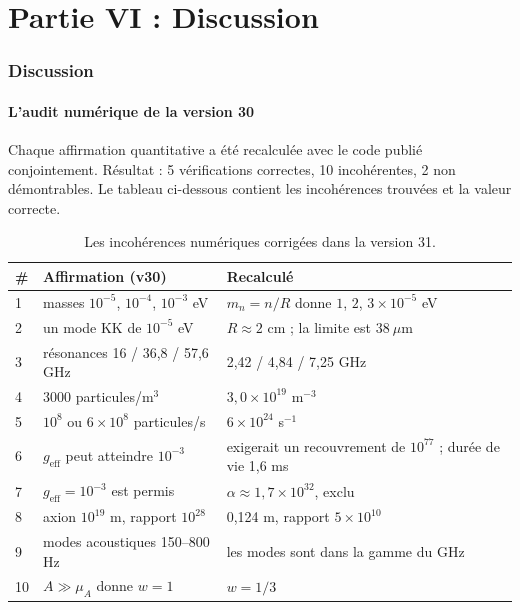 \part*{Partie VI : Discussion}

\section{Discussion}
\subsection{L'audit numérique de la version 30}
Chaque affirmation quantitative a été recalculée avec le code publié conjointement. Résultat : 5 vérifications correctes, 10 incohérentes, 2 non démontrables. Le tableau ci-dessous contient les incohérences trouvées et la valeur correcte.

\begin{table}[H]
\centering
\small
\begin{tabular}{@{}p{0.5cm}p{6.2cm}p{5.2cm}@{}}
\toprule
\# & \textbf{Affirmation (v30)} & \textbf{Recalculé} \\ \midrule
1 & masses $10^{-5}$, $10^{-4}$, $10^{-3}$ eV & $m_n = n/R$ donne $1$, $2$, $3 \times 10^{-5}$ eV \\
2 & un mode KK de $10^{-5}$ eV & $R \approx 2$ cm ; la limite est $38\ \mu$m \\
3 & résonances 16 / 36,8 / 57,6 GHz & 2,42 / 4,84 / 7,25 GHz \\
4 & 3000 particules/m$^3$ & $3,0\times10^{19}$ m$^{-3}$ \\
5 & $10^8$ ou $6\times10^8$ particules/s & $6\times10^{24}$ s$^{-1}$ \\
6 & $g_{\text{eff}}$ peut atteindre $10^{-3}$ & exigerait un recouvrement de $10^{77}$ ; durée de vie 1,6 ms \\
7 & $g_{\text{eff}} = 10^{-3}$ est permis & $\alpha \approx 1,7\times10^{32}$, exclu \\
8 & axion $10^{19}$ m, rapport $10^{28}$ & 0,124 m, rapport $5\times10^{10}$ \\
9 & modes acoustiques 150--800 Hz & les modes sont dans la gamme du GHz \\
10 & $A \gg \mu_A$ donne $w = 1$ & $w = 1/3$ \\ \bottomrule
\end{tabular}
\caption{Les incohérences numériques corrigées dans la version 31.}
\label{tab:audit}
\end{table}

